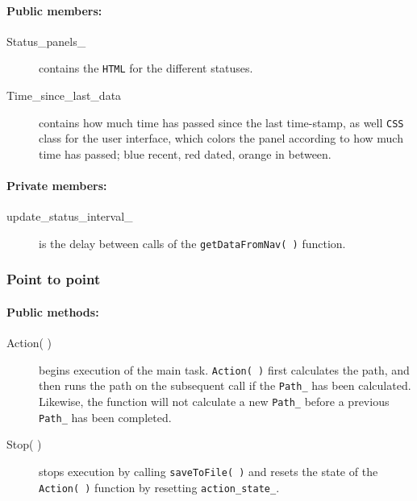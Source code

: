 \paragraph{Public members:}
\begin{adjustwidth}{2.5em}{0pt}\begin{description}
		\item [Status_panels_] contains the \texttt{HTML} for the different statuses.
		\item [Time_since_last_data] contains how much time has passed since the last time-stamp, as well \texttt{CSS} class for the user interface, which colors the panel according to how much time has passed; blue recent, red dated, orange in between.
\end{description}\end{adjustwidth}


\paragraph{Private members:}
\begin{adjustwidth}{2.5em}{0pt}\begin{description}
		\item [update_status_interval_] is the delay between calls of the \texttt{getDataFromNav( )} function.
\end{description}\end{adjustwidth}


\subsubsection{Point to point}

\paragraph{Public methods:}
\begin{adjustwidth}{2.5em}{0pt}\begin{description}
		\item [Action( )] begins execution of the main task. \texttt{Action( )} first calculates the path, and then runs the path on the subsequent call if the \texttt{Path_} has been calculated. Likewise, the function will not calculate a new \texttt{Path_} before a previous \texttt{Path_} has been completed. 
		\item [Stop( )] stops execution by calling \texttt{saveToFile( )} and resets the state of the \texttt{Action( )} function by resetting \texttt{action_state_}.
\end{description}\end{adjustwidth}


